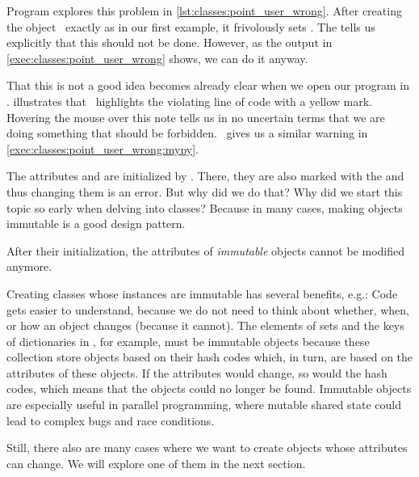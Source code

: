 Program  explores this problem in \cref{lst:classes:point_user_wrong}.
After creating the  object~ exactly as in our first example, it frivolously sets .
The   tells us explicitly that this should not be done.
However, as the output in \cref{exec:classes:point_user_wrong} shows, we can do it anyway.

That this is not a good idea becomes already clear when we open our program in \pycharm.
 illustrates that \pycharm\ highlights the violating line of code with a yellow mark.
Hovering the mouse over this note tells us in no uncertain terms that we are doing something that should be forbidden.
\mypy\ gives us a similar warning in \cref{exec:classes:point_user_wrong:mypy}.

The attributes  and  are initialized by .
There, they are also marked with the   and thus changing them is an error.
But why did we do that?
Why did we start this topic so early when delving into classes?
Because in many cases, making objects immutable is a good design pattern.%
%
%
%
\begin{definition}[Immutable]%
After their initialization, the attributes of \emph{immutable} objects cannot be modified anymore.%
\end{definition}%
%
Creating classes whose instances are immutable has several benefits, e.g.:
Code gets easier to understand, because we do not need to think about whether, when, or how an object changes (because it cannot).
The elements of sets and the keys of dictionaries in \python, for example, must be immutable objects because these collection store objects based on their hash codes which, in turn, are based on the attributes of these objects.
If the attributes would change, so would the hash codes, which means that the objects could no longer be found.
Immutable objects are especially useful in parallel programming, where mutable shared state could lead to complex bugs and race conditions.

Still, there also are many cases where we want to create objects whose attributes can change.
We will explore one of them in the next section.

